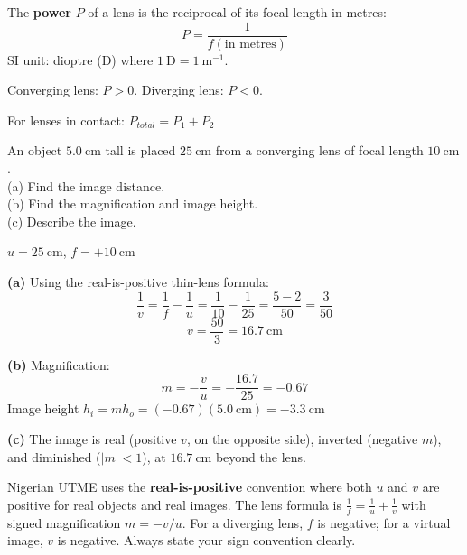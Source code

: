 \begin{lawbox}
The \textbf{power} $P$ of a lens is the reciprocal
of its focal length in metres:
\[
  P = \frac{1}{f(\text{in metres})}
\]
SI unit: dioptre (D) where $1\ \text{D}
= 1\ \text{m}^{-1}$.

Converging lens: $P > 0$.
Diverging lens: $P < 0$.

For lenses in contact:
$P_{total} = P_1 + P_2$
\end{lawbox}

\begin{examplebox}[20.3]
An object $5.0\ \text{cm}$ tall is placed
$25\ \text{cm}$ from a converging lens of focal
length $10\ \text{cm}$.\\
(a) Find the image distance.\\
(b) Find the magnification and image height.\\
(c) Describe the image.
\end{examplebox}

\begin{solutionbox}
$u = 25\ \text{cm}$, $f = +10\ \text{cm}$

\textbf{(a)} Using the real-is-positive thin-lens formula:
\[
  \frac{1}{v} = \frac{1}{f} - \frac{1}{u}
  = \frac{1}{10} - \frac{1}{25}
  = \frac{5-2}{50} = \frac{3}{50}
\]
\[
  v = \frac{50}{3} = 16.7\ \text{cm}
\]

\textbf{(b)} Magnification:
\[
  m = -\frac{v}{u} = -\frac{16.7}{25} = -0.67
\]
Image height $h_i = m h_o = (-0.67)(5.0\ \text{cm})
= -3.3\ \text{cm}$

\textbf{(c)} The image is real (positive $v$, on the
opposite side), inverted (negative $m$), and diminished
($|m| < 1$), at $16.7\ \text{cm}$ beyond the lens.
\end{solutionbox}

\begin{examtipbox}
Nigerian UTME uses the \textbf{real-is-positive}
convention where both $u$ and $v$ are positive for
real objects and real images. The lens formula is
$\frac{1}{f} = \frac{1}{u} + \frac{1}{v}$ with signed
magnification $m = -v/u$. For a diverging lens, $f$
is negative; for a virtual image, $v$ is negative.
Always state your sign convention clearly.
\end{examtipbox}

